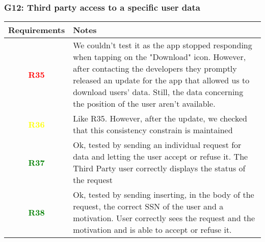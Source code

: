 \subsubsection{G12: Third party access to a specific user data}
  \begin{adjustwidth}{1cm}{}
        \begin{longtable}{|c|p{}|}
            \hline
            \textbf{Requirements} & \textbf{Notes} \\
            \hline
            \textbf{\textcolor{red}{R35}} & We couldn't test it as the app stopped responding when tapping on the "Download" icon.
            However, after contacting the developers they promptly released an update for the app that allowed us to download users' data. Still, the data concerning the position of the user aren't available.\\
            \hline
            \textbf{\textcolor{yellow}{R36}} & Like R35. However, after the update, we checked that this consistency constrain is maintained \\
            \hline
            \textbf{\textcolor{green}{R37}} & Ok, tested by sending an individual request for data and letting the user accept or refuse it. The Third Party user correctly displays the status of the request  \\
            \hline
            \textbf{\textcolor{green}{R38}} & Ok, tested by sending inserting, in the body of the request, the correct SSN of the user and a motivation. User correctly sees the request and the motivation and is able to accept or refuse it.  \\
            \hline
            
            
            
        \end{longtable}
    \end{adjustwidth}
    
